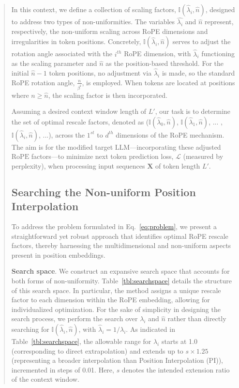 \begin{abstract}
In this context, we define a collection of scaling factors, $\mathbb{I}(\hat{\lambda}_{i},\hat{n})$, designed to address two types of non-uniformities. The variables $\hat{\lambda_i}$ and $\hat{n}$ represent, respectively, the non-uniform scaling across RoPE dimensions and irregularities in token positions. Concretely, $\mathbb{I}(\hat{\lambda}_{i},\hat{n})$ serves to adjust the rotation angle associated with the $i^{th}$ RoPE dimension, with $\hat\lambda_{i}$ functioning as the scaling parameter and $\hat{n}$ as the position-based threshold. For the initial $\hat{n}-1$ token positions, no adjustment via $\hat\lambda_{i}$ is made, so the standard RoPE rotation angle, $\frac{n}{\beta^i}$, is employed. When tokens are located at positions where $n \geq \hat{n}$, the scaling factor is then incorporated.

Assuming a desired context window length of $L'$, our task is to determine the set of optimal rescale factors, denoted as ($\mathbb{I}(\hat{\lambda}_{0},\hat{n})$, $\mathbb{I}(\hat{\lambda}_{1},\hat{n})$, ... ,$\mathbb{I}(\hat{\lambda}_{i},\hat{n})$, ...), across the $1^{st}$ to $d^{th}$ dimensions of the RoPE mechanism. The aim is for the modified target $\text{LLM}$—incorporating these adjusted $\text{RoPE}$ factors—to minimize next token prediction loss, $\mathcal{L}$ (measured by perplexity), when processing input sequences $\mathbf{X}$ of token length $L'$.

\subsection{Searching the Non-uniform Position Interpolation}

To address the problem formulated in Eq.~\ref{eq:problem}, we present a straightforward yet robust approach that identifies optimal RoPE rescale factors, thereby harnessing the multidimensional and non-uniform aspects present in position embeddings.

\textbf{Search space}. We construct an expansive search space that accounts for both forms of non-uniformity. Table~\ref{tbl:searchspace} details the structure of this search space. In particular, the method assigns a unique rescale factor to each dimension within the RoPE embedding, allowing for individualized optimization. For the sake of simplicity in designing the search process, we perform the search over $\lambda_i$ and $\hat{n}$ rather than directly searching for $\mathbb{I}(\hat{\lambda}_{i},\hat{n})$, with $\hat{\lambda}_{i}=1/\lambda_i$. As indicated in Table~\ref{tbl:searchspace}, the allowable range for $\lambda_i$ starts at 1.0 (corresponding to direct extrapolation) and extends up to $s\times1.25$ (representing a broader interpolation than Position Interpolation (PI)), incremented in steps of 0.01. Here, $s$ denotes the intended extension ratio of the context window.


\end{abstract}
